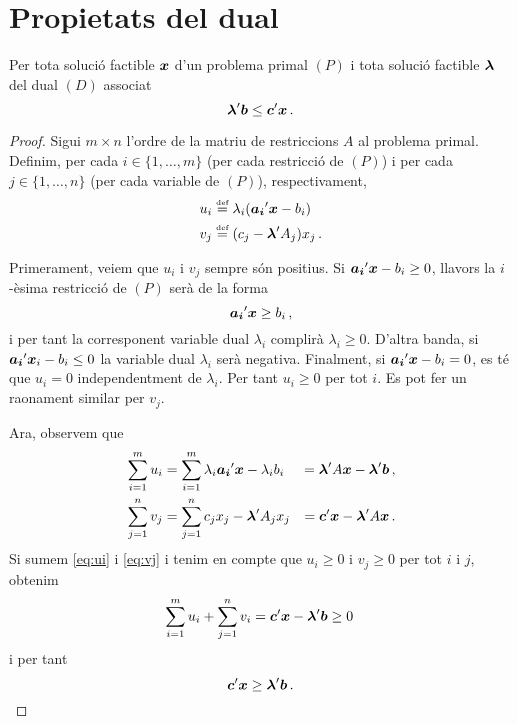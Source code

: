 \section{Propietats del dual}
\begin{teo}\label{teo:dualitat-feble}
    Per tota solució factible $\boldsymbol{x}$ d'un problema primal $\left(P\right)$ i tota solució factible $\boldsymbol{\lambda}$ del dual $\left(D\right)$ associat
    \[ \boldsymbol{\lambda}'\boldsymbol{b}\leq \boldsymbol{c}'\boldsymbol{x}\,. \]
    \begin{proof}
    	Sigui $m\times n$ l'ordre de la matriu de restriccions $A$ al problema primal. Definim, per cada $i\in\{1,\ldots,m\}$ (per cada restricció de $(P)$) i per cada $j\in\{1,\ldots,n\}$ (per cada variable de $(P)$), respectivament, 
    	\begin{align*}
    		u_i &\stackrel{\text{\tiny def}}{=} {{\lambda}}_i(\boldsymbol{\boldsymbol{a_i}}'\boldsymbol{\boldsymbol{x}}-b_i)\\
    		v_j &\stackrel{\text{\tiny def}}{=} (c_j - \boldsymbol{\boldsymbol{\lambda}}'A_j)x_j\,.
    	\end{align*}
    	
    	Primerament, veiem que $u_i$ i $v_j$ sempre són positius. Si $\boldsymbol{\boldsymbol{a_i}}'\boldsymbol{\boldsymbol{x}}-b_i \ge 0$, llavors la $i$-èsima restricció de $(P)$ serà de la forma \[\boldsymbol{\boldsymbol{a_i}}'\boldsymbol{\boldsymbol{x}} \ge b_i\,,\] i per tant la corresponent variable dual $\lambda_i$ complirà $\lambda_i \ge 0$. D'altra banda, si $\boldsymbol{\boldsymbol{a_i}}'\boldsymbol{\boldsymbol{x}}_i-b_i \le 0$ la variable dual $\lambda_i$ serà negativa. Finalment, si $\boldsymbol{\boldsymbol{a_i}}'\boldsymbol{\boldsymbol{x}}-b_i = 0$, es té que $u_i = 0$ independentment de $\lambda_i$. Per tant $u_i \ge 0$ per tot $i$. Es pot fer un raonament similar per $v_j$.
    	
    	Ara, observem que
    	\begin{alignat}{2}{}
    		\sum_{i = 1}^{m} u_i &= \sum_{i = 1}^{m} \lambda_i\boldsymbol{\boldsymbol{a_i}}'\boldsymbol{\boldsymbol{x}}-\lambda_ib_i &= \boldsymbol{\boldsymbol{\lambda}}'A\boldsymbol{\boldsymbol{x}} - \boldsymbol{\boldsymbol{\lambda}}'\boldsymbol{b}\,, \label{eq:ui}\\
    		\sum_{j = 1}^{n} v_j &= \sum_{j = 1}^{n} c_jx_j - \boldsymbol{\boldsymbol{\lambda}}'A_jx_j &= \boldsymbol{\boldsymbol{c}}'\boldsymbol{\boldsymbol{x}} - \boldsymbol{\boldsymbol{\lambda}}'A\boldsymbol{\boldsymbol{x}}\,. \label{eq:vj}
    	\end{alignat}
    	Si sumem \eqref{eq:ui} i \eqref{eq:vj} i tenim en compte que $u_i \ge 0$ i $v_j \ge 0$ per tot $i$ i $j$, obtenim
    	\begin{equation}\label{eq:sum-ui-vj}
    		\sum_{i = 1}^{m} u_i + \sum_{j = 1}^{n} v_i= \boldsymbol{\boldsymbol{c}}'\boldsymbol{\boldsymbol{x}}-\boldsymbol{\boldsymbol{\lambda}}'\boldsymbol{b} \ge 0\,
    	\end{equation}
    	i per tant \[\boldsymbol{\boldsymbol{c}}'\boldsymbol{\boldsymbol{x}} \ge \boldsymbol{\boldsymbol{\lambda}}'\boldsymbol{b}\,.\]
    \end{proof}
\end{teo}
